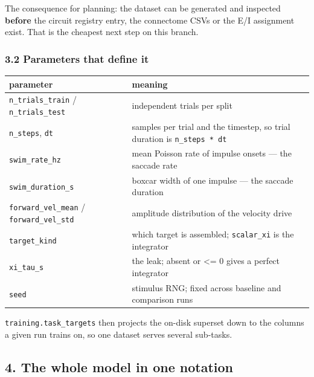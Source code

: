 \documentclass[10pt]{article}
\begin{document}
The consequence for planning: the dataset can be generated and inspected \textbf{before} the
circuit registry entry, the connectome CSVs or the E/I assignment exist. That is the
cheapest next step on this branch.

\subsubsection*{3.2 Parameters that define it}

\begin{center}\small
\begin{tabularx}{\textwidth}{>{\raggedright\arraybackslash}X>{\raggedright\arraybackslash}X}\toprule
parameter & meaning \\\midrule
\texttt{n\_trials\_train} / \texttt{n\_trials\_test} & independent trials per split \\
\texttt{n\_steps}, \texttt{dt} & samples per trial and the timestep, so trial duration is \texttt{n\_steps * dt} \\
\texttt{swim\_rate\_hz} & mean Poisson rate of impulse onsets --- the saccade rate \\
\texttt{swim\_duration\_s} & boxcar width of one impulse --- the saccade duration \\
\texttt{forward\_vel\_mean} / \texttt{forward\_vel\_std} & amplitude distribution of the velocity drive \\
\texttt{target\_kind} & which target is assembled; \texttt{scalar\_xi} is the integrator \\
\texttt{xi\_tau\_s} & the leak; absent or <= 0 gives a perfect integrator \\
\texttt{seed} & stimulus RNG; fixed across baseline and comparison runs \\
\bottomrule\end{tabularx}\end{center}

\texttt{training.task\_targets} then projects the on-disk superset down to the columns a
given run trains on, so one dataset serves several sub-tasks.

\subsection*{4. The whole model in one notation}
\end{document}
